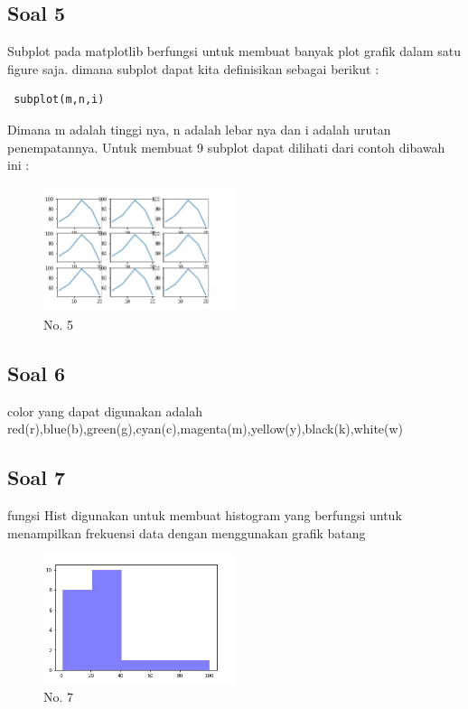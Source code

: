 	\subsection {Soal 5}
	Subplot pada matplotlib berfungsi untuk membuat banyak plot grafik dalam satu figure saja.
	dimana  subplot dapat kita definisikan sebagai berikut :
	
	\begin{verbatim} subplot(m,n,i) 
	\end{verbatim}
	Dimana m adalah tinggi nya, n adalah lebar nya dan i adalah urutan penempatannya.
	Untuk membuat 9 subplot dapat dilihati dari contoh dibawah ini :

	

	\begin{figure}[ht]
            \centerline{\includegraphics[width=0.5\textwidth]{figures/6/1174040/Teori/1174040_no5.png}}
            \caption{No. 5}
            \label{1174040_chap6_no5}
            \end{figure}

	\subsection{Soal 6}
	color yang dapat digunakan adalah red(r),blue(b),green(g),cyan(c),magenta(m),yellow(y),black(k),white(w)

	\subsection{Soal 7}
	fungsi Hist digunakan untuk membuat histogram yang berfungsi untuk menampilkan frekuensi data dengan menggunakan grafik batang

	

	\begin{figure}[ht]
            \centerline{\includegraphics[width=0.5\textwidth]{figures/6/1174040/Teori/1174040_no7.png}}
            \caption{No. 7}
            \label{1174040_chap6_no7}
            \end{figure}

